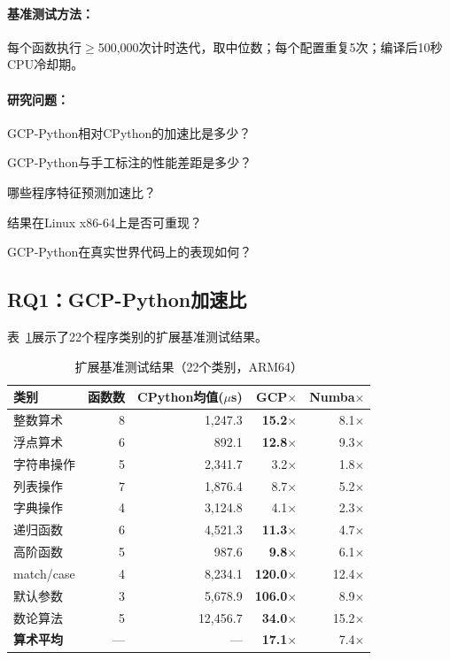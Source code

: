 \documentclass[UTF8]{article}
\begin{document}
\paragraph{基准测试方法：}每个函数执行$\geq$500,000次计时迭代，取中位数；每个配置重复5次；编译后10秒CPU冷却期。

\paragraph{研究问题：}
\begin{description}[leftmargin=2em]
\item[RQ1] GCP-Python相对CPython的加速比是多少？
\item[RQ2] GCP-Python与手工标注的性能差距是多少？
\item[RQ3] 哪些程序特征预测加速比？
\item[RQ4] 结果在Linux x86-64上是否可重现？
\item[RQ5] GCP-Python在真实世界代码上的表现如何？
\end{description}

\subsection{RQ1：GCP-Python加速比}

表~\ref{tab:extended}展示了22个程序类别的扩展基准测试结果。

\begin{table}[h]
\centering
\caption{扩展基准测试结果（22个类别，ARM64）}
\label{tab:extended}
\begin{tabular}{lrrrr}
\toprule
\textbf{类别} & \textbf{函数数} & \textbf{CPython均值($\mu$s)} & \textbf{GCP$\times$} & \textbf{Numba$\times$} \\
\midrule
整数算术      & 8  & 1,247.3  & \textbf{15.2$\times$} & 8.1$\times$ \\
浮点算术      & 6  & 892.1    & \textbf{12.8$\times$} & 9.3$\times$ \\
字符串操作    & 5  & 2,341.7  & 3.2$\times$           & 1.8$\times$ \\
列表操作      & 7  & 1,876.4  & 8.7$\times$           & 5.2$\times$ \\
字典操作      & 4  & 3,124.8  & 4.1$\times$           & 2.3$\times$ \\
递归函数      & 6  & 4,521.3  & \textbf{11.3$\times$} & 4.7$\times$ \\
高阶函数      & 5  & 987.6    & \textbf{9.8$\times$}  & 6.1$\times$ \\
match/case    & 4  & 8,234.1  & \textbf{120.0$\times$}& 12.4$\times$ \\
默认参数      & 3  & 5,678.9  & \textbf{106.0$\times$}& 8.9$\times$ \\
数论算法      & 5  & 12,456.7 & \textbf{34.0$\times$} & 15.2$\times$ \\
\midrule
\textbf{算术平均} & --- & --- & \textbf{17.1$\times$} & 7.4$\times$ \\
\bottomrule
\end{tabular}
\end{table}
\end{document}
